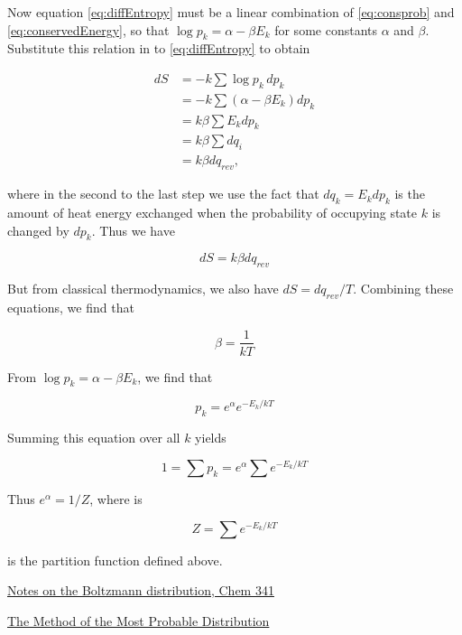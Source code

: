 Now  equation \eqref{eq:diffEntropy} must be a linear combination of \eqref{eq:consprob}
and \eqref{eq:conservedEnergy}, so that $\log p_k = \alpha - \beta E_k$
for some constants $\alpha$ and $\beta$.  Substitute this relation in to \eqref{eq:diffEntropy} to obtain

\begin{align}
 dS & = -k \sum \log p_k\,  dp_k \\
      & = -k \sum (\alpha - \beta E_k) dp_k \\
      & = k\beta \sum E_k dp_k \\
     & = k\beta \sum dq_i \\
    & = k\beta dq_{rev},
\end{align}

where in the second to the last step we use the fact that $dq_k = E_k dp_k$  is the  amount of heat energy exchanged when the
probability of occupying state $k$ is changed by $dp_k$.  Thus we have

$$
dS = k\beta dq_{rev}
$$


But from classical thermodynamics, we also have $dS = dq_{rev}/T$.  Combining these equations, we find that

\begin{equation}
\beta = \frac{1}{kT}
\end{equation}

From $\log p_k = \alpha - \beta E_k$, we find that

\begin{equation}
p_k = e^\alpha e^{-E_k/kT}
\end{equation}

Summing this equation over all $k$ yields

\begin{equation}
1 = \sum p_k = e^\alpha \sum e^{-E_k/kT}
\end{equation}

Thus $e^\alpha = 1/Z$, where is 

\begin{equation}
Z = \sum e^{-E_k/kT}
\end{equation}

is the partition function defined above.



\href{http://casegroup.rutgers.edu/lnotes/ccb341/boltzmann.pdf}{Notes on the Boltzmann distribution, Chem 341}

\href{http://www.physics.udel.edu/~glyde/PHYS813/Lectures/chapter_3.pdf}{The Method of the Most Probable Distribution}











